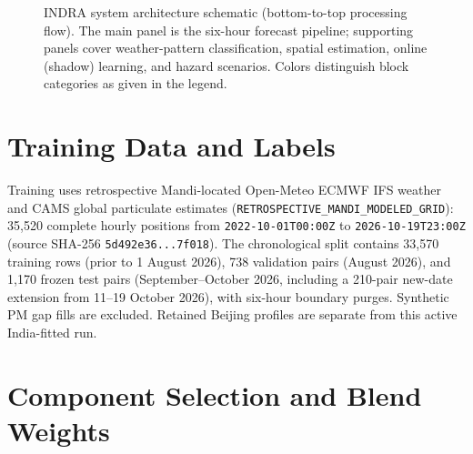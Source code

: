 \documentclass[journal,a4paper]{IEEEtran}
\begin{document}
\begin{figure}[!p]
{{}}
\caption{INDRA system architecture schematic (bottom-to-top processing flow). The main panel is the six-hour forecast pipeline; supporting panels cover weather-pattern classification, spatial estimation, online (shadow) learning, and hazard scenarios. Colors distinguish block categories as given in the legend.}
\label{fig:architecture}
\end{figure}

\section{Training Data and Labels}

Training uses retrospective Mandi-located Open-Meteo ECMWF IFS weather and CAMS global particulate estimates (\texttt{RETROSPECTIVE\_MANDI\_MODELED\_GRID}): 35{,}520 complete hourly positions from \texttt{2022-10-01T00:00Z} to \texttt{2026-10-19T23:00Z} (source SHA-256 \texttt{5d492e36...7f018}). The chronological split contains 33{,}570 training rows (prior to 1 August 2026), 738 validation pairs (August 2026), and 1{,}170 frozen test pairs (September--October 2026, including a 210-pair new-date extension from 11--19 October 2026), with six-hour boundary purges. Synthetic PM gap fills are excluded. Retained Beijing profiles are separate from this active India-fitted run.

\section{Component Selection and Blend Weights}
\end{document}
